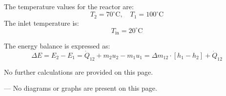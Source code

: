 The temperature values for the reactor are:  
\[
T_2 = 70^\circ\text{C}, \quad T_1 = 100^\circ\text{C}
\]  
The inlet temperature is:  
\[
T_{\text{in}} = 20^\circ\text{C}
\]  

The energy balance is expressed as:  
\[
\Delta E = E_2 - E_1 = \dot{Q}_{12} + m_2 u_2 - m_1 u_1 = \Delta m_{12} \cdot \left[ h_1 - h_2 \right] + \dot{Q}_{12}
\]  

No further calculations are provided on this page.  

---  
No diagrams or graphs are present on this page.